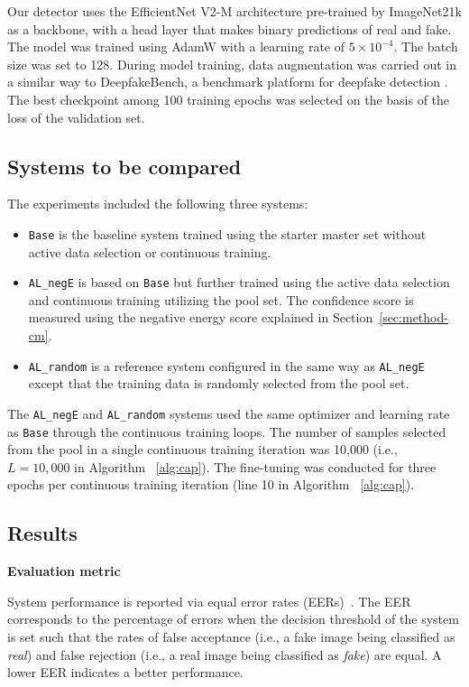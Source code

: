 \documentclass[english]{lni}
\begin{document}
Our detector uses the EfficientNet V2-M architecture \cite{pmlr-v139-tan21a} pre-trained by ImageNet21k \cite{deng2009imagenet} as a backbone, with a head layer that makes binary predictions of real and fake. The model was trained using AdamW with a learning rate of $5\times10^{-4}$. The batch size was set to 128. During model training, data augmentation was carried out in a similar way to DeepfakeBench, a benchmark platform for deepfake detection \cite{yan2023deepfakebench}. The best checkpoint among 100 training epochs was selected on the basis of the loss of the validation set. 

\subsection{Systems to be compared}

The experiments included the following three systems:
\begin{itemize}
\item \texttt{Base} is the baseline system trained using the starter master set without active data selection or continuous training.
\item \texttt{AL\_negE} is based on \texttt{Base} but further trained using the active data selection and continuous training utilizing the pool set. The confidence score is measured using the negative energy score explained in Section~\ref{sec:method-cm}.
\item \texttt{AL\_random} is a reference system configured in the same way as \texttt{AL\_negE} except that the training data is randomly selected from the pool set. 
\end{itemize}


The \texttt{AL\_negE} and \texttt{AL\_random} systems used the same optimizer and learning rate as \texttt{Base} through the continuous training loops. The number of samples selected from the pool in a single continuous training iteration was 10,000 (i.e., $L=10,000$ in Algorithm ~\ref{alg:cap}). The fine-tuning was conducted for three epochs per continuous training iteration (line 10 in Algorithm ~\ref{alg:cap}).

\subsection{Results}

\noindent
\textbf{Evaluation metric} 

System performance is reported via equal error rates (EERs)~\cite{iso2017iso}. The EER corresponds to the percentage of errors when the decision threshold of the system is set such that the rates of false acceptance (i.e., a fake image being classified as \emph{real}) and false rejection (i.e., a real image being classified as \emph{fake}) are equal. A lower EER indicates a better performance. 
\end{document}
